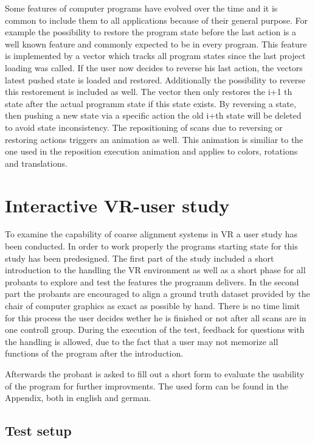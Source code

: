\documentclass[hyperref,english,bachelorofscience,bibnum]{cgvpub}
\begin{document}
Some features of computer programs have evolved over the time and it is common to include them to all applications because of their general purpose. For example the possibility to restore the program state before the last action is a well known feature and commonly expected to be in every program. %
This feature is implemented by a vector which tracks all program states since the last project loading was called. If the user now decides to reverse his last action, the vectors latest pushed state is loaded and restored. Additionally the possibility to reverse this restorement is included as well. The vector then only restores the i+1 th state after the actual programm state if this state exists. By reversing a state, then pushing a new state via a specific action the old i+th state will be deleted to avoid state inconsistency.
The repositioning of scans due to reversing or restoring actions triggers an animation as well. This animation is similiar to the one used in the reposition execution animation and applies to colors, rotations and translations.

\chapter{Interactive VR-user study}

To examine the capability of coarse alignment systems in VR a user study has been conducted. In order to work properly the programs starting state for this study has been predesigned. The first part of the study included a short introduction to the handling the VR environment as well as a short phase for all probants to explore and test the features the programm delivers. In the second part the probants are encouraged to align a ground truth dataset provided by the chair of computer graphics as exact as possible by hand. %
There is no time limit for this process the user decides wether he is finished or not after all scans are in one controll group. During the execution of the test, feedback for questions with the handling is allowed, due to the fact that a user may not memorize all functions of the program after the introduction.

Afterwards the probant is asked to fill out a short form to evaluate the usability of the program for further improvments. The used form can be found in the Appendix, both in english and german. 

\section{Test setup}
\end{document}
